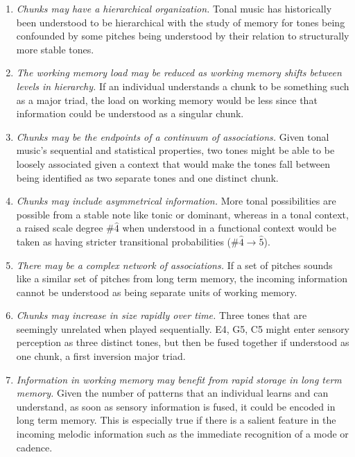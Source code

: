 \documentclass[12pt,]{book}
\providecommand{\tightlist}{%
  \setlength{\itemsep}{0pt}\setlength{\parskip}{0pt}}
\begin{document}
\begin{enumerate}
\def\labelenumi{\arabic{enumi}.}
\tightlist
\item
  \emph{Chunks may have a hierarchical organization.} Tonal music has historically been understood to be hierarchical \citep{krumhanslCognitiveFoundationsMusical2001, meyerEmotionMeaningMusic1956, schenkerFreieSatz1935} with the study of memory for tones being confounded by some pitches being understood by their relation to structurally more stable tones.
\item
  \emph{The working memory load may be reduced as working memory shifts between levels in hierarchy.} If an individual understands a chunk to be something such as a major triad, the load on working memory would be less since that information could be understood as a singular chunk.
\item
  \emph{Chunks may be the endpoints of a continuum of associations.} Given tonal music's sequential and statistical properties, two tones might be able to be loosely associated given a context that would make the tones fall between being identified as two separate tones and one distinct chunk.
\item
  \emph{Chunks may include asymmetrical information.} More tonal possibilities are possible from a stable note like tonic or dominant, whereas in a tonal context, a raised scale degree \#\(\hat{4}\) when understood in a functional context would be taken as having stricter transitional probabilities (\#\(\hat{4} \rightarrow \hat{5}\)).
\item
  \emph{There may be a complex network of associations.} If a set of pitches sounds like a similar set of pitches from long term memory, the incoming information cannot be understood as being separate units of working memory.
\item
  \emph{Chunks may increase in size rapidly over time.} Three tones that are seemingly unrelated when played sequentially. E4, G5, C5 might enter sensory perception as three distinct tones, but then be fused together if understood as one chunk, a first inversion major triad.
\item
  \emph{Information in working memory may benefit from rapid storage in long term memory.} Given the number of patterns that an individual learns and can understand, as soon as sensory information is fused, it could be encoded in long term memory. This is especially true if there is a salient feature in the incoming melodic information such as the immediate recognition of a mode or cadence.
\end{enumerate}
\end{document}
